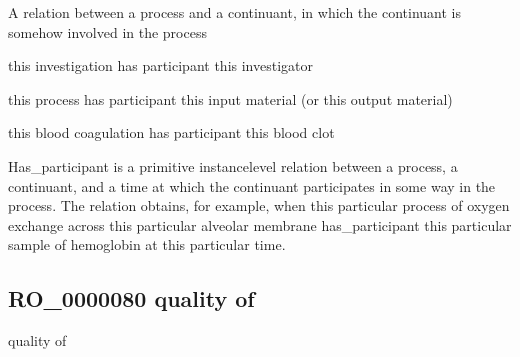 \documentclass[letterpaper,10pt,english]{sphinxmanual}
\begin{document}
\begin{sphinxShadowBox}

\sphinxAtStartPar
{}
\end{sphinxShadowBox}

\begin{sphinxShadowBox}

\sphinxAtStartPar
A relation between a process and a continuant, in which the continuant is somehow involved in the process
\end{sphinxShadowBox}

\begin{sphinxShadowBox}

\sphinxAtStartPar
this investigation has participant this investigator

\sphinxAtStartPar
this process has participant this input material (or this output material)

\sphinxAtStartPar
this blood coagulation has participant this blood clot
\end{sphinxShadowBox}

\begin{sphinxShadowBox}

\sphinxAtStartPar
Has\_participant is a primitive instance\sphinxhyphen{}level relation between a process, a continuant, and a time at which the continuant participates in some way in the process. The relation obtains, for example, when this particular process of oxygen exchange across this particular alveolar membrane has\_participant this particular sample of hemoglobin at this particular time.
\end{sphinxShadowBox}

\begin{sphinxShadowBox}

\sphinxAtStartPar
{}
\end{sphinxShadowBox}
\begin{quote}

\ignorespaces \end{quote}


\subsection{RO\_0000080 \sphinxhyphen{} quality of}
\label{\detokenize{doc-RO_0000080:ro-0000080-quality-of}}\label{\detokenize{doc-RO_0000080:index-0}}\label{\detokenize{doc-RO_0000080::doc}}
\begin{sphinxShadowBox}

\sphinxAtStartPar
quality of
\end{sphinxShadowBox}
\end{document}
